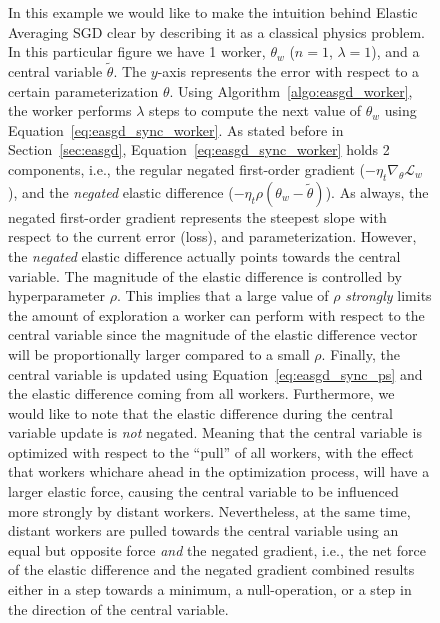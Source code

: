 \begin{figure}[H]
  \caption{In this example we would like to make the intuition behind Elastic Averaging SGD clear by describing it as a classical physics problem. In this particular figure we have 1 worker, $\theta_w$ ($n = 1$, $\lambda = 1$), and a central variable $\tilde{\theta}$. The $y$-axis represents the error with respect to a certain parameterization $\theta$. Using Algorithm~\ref{algo:easgd_worker}, the worker performs $\lambda$ steps to compute the next value of $\theta_w$ using Equation~\ref{eq:easgd_sync_worker}. As stated before in Section~\ref{sec:easgd}, Equation~\ref{eq:easgd_sync_worker} holds 2 components, i.e., the regular negated first-order gradient ($-\eta_t \nabla_\theta \mathcal{L}_w$), and the \emph{negated} elastic difference ($-\eta_t\rho(\theta_w - \tilde{\theta})$). As always, the negated first-order gradient represents the steepest slope with respect to the current error (loss), and parameterization. However, the \emph{negated} elastic difference actually points towards the central variable. The magnitude of the elastic difference is controlled by hyperparameter $\rho$. This implies that a large value of $\rho$ \emph{strongly} limits the amount of exploration a worker can perform with respect to the central variable since the magnitude of the elastic difference vector will be proportionally larger compared to a small $\rho$. Finally, the central variable is updated using Equation~\ref{eq:easgd_sync_ps} and the elastic difference coming from all workers. Furthermore, we would like to note that the elastic difference during the central variable update is \emph{not} negated. Meaning that the central variable is optimized with respect to the ``pull'' of all workers, with the effect that workers whichare ahead in the optimization process, will have a larger elastic force, causing the central variable to be influenced more strongly by distant workers. Nevertheless, at the same time, distant workers are pulled towards the central variable using an equal but opposite force \emph{and} the negated gradient, i.e., the net force of the elastic difference and the negated gradient combined results either in a step towards a minimum, a null-operation, or a step in the direction of the central variable.}
  \label{fig:easgd_sync}
\end{figure}

